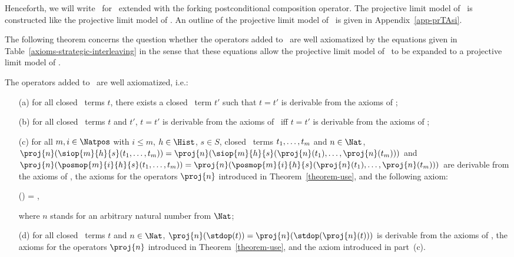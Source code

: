 \documentclass{llncs}
\begin{document}
Henceforth, we will write \prBTAnt\ for \prBTA\ extended with the 
forking postconditional composition operator.
The projective limit model of \prBTAnt\ is constructed like the 
projective limit model of \prBTA.
An outline of the projective limit model of \prBTAnt\ is given in 
Appendix~\ref{app-prTAsi}.

The following theorem concerns the question whether the operators added
to \prBTAnt\ are well axiomatized by the equations given in 
Table~\ref{axioms-strategic-interleaving} in the sense that these 
equations allow the projective limit model of \prBTAnt\ to be expanded 
to a projective limit model of \prTA.
\begin{theorem}
\label{theorem-si}
The operators added to \prBTAnt\ are well axiomatized, i.e.:
\begin{enumerate}
\item[(a)]
for all closed \prTA\ terms $t$, there exists a closed \prBTAnt\ term 
$t'$ such that $t = t'$ is derivable from the axioms of \prTA;
\item[(b)]
for all closed \prBTAnt\ terms $t$ and $t'$,
$t = t'$ is derivable from the axioms of \prBTAnt\ iff
$t = t'$ is derivable from the axioms of \prTA;
\item[(c)]
for all $m ,i\in \Natpos$ with $i \leq m$, $h \in \Hist$, $s \in S$, 
closed \prTA\ terms $t_1,\linebreak[2]\ldots,t_m$ and $n \in \Nat$, 
$\proj{n}(\siop{m}{h}{s}(t_1,\ldots,t_m)) =
 \proj{n}(\siop{m}{h}{s}(\proj{n}(t_1),\ldots,\proj{n}(t_m)))$ and
$\proj{n}(\posmop{m}{i}{h}{s}(t_1,\ldots,t_m)) =
 \proj{n}(\posmop{m}{i}{h}{s}(\proj{n}(t_1),\ldots,\proj{n}(t_m)))$ 
are derivable from the axioms of \prTA, the axioms for the operators 
$\proj{n}$ introduced in Theorem~\ref{theorem-use}, and
the following axiom:
\begin{ldispl}
\begin{geqns}
() = 
\;,              
\end{geqns}
\end{ldispl}where $n$ stands for an arbitrary natural number from $\Nat$;
\item[(d)]
for all closed \prTA\ terms $t$ and $n \in \Nat$, 
$\proj{n}(\stdop(t)) = \proj{n}(\stdop(\proj{n}(t)))$ 
is derivable from the axioms of \prTA, the axioms for the operators 
$\proj{n}$ introduced in Theorem~\ref{theorem-use}, and the axiom
introduced in part~(c).
\end{enumerate}
\end{theorem}
\end{document}
